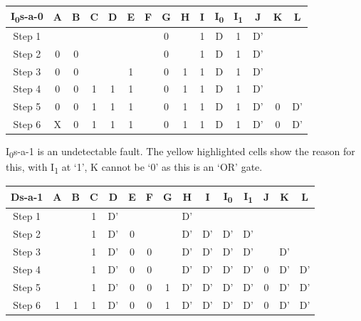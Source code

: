 \documentclass[11pt]{report}
\begin{document}
\begin{tabular}{ |c||c|c|c|c|c|c|c|c|c|c|c|c|c|c| }
\hline
\bf I\textsubscript{0}s-a-0 & \bf A & \bf B & \bf C & \bf D & \bf E & \bf F & G & H & I & I\textsubscript{0} & I\textsubscript{1} & J & K & \bf L \\
\hline
\hline
Step 1 & & & & & & & 0 & & 1 & D & 1 & D' & & \\
\hline
Step 2 & 0 & 0 & & & & & 0 & & 1 & D & 1 & D' & & \\
\hline
Step 3 & 0 & 0 & & & 1 & & 0 & 1 & 1 & D & 1 & D' & & \\
\hline
Step 4 & 0 & 0 & 1 & 1 & 1 & & 0 & 1 & 1 & D & 1 & D' & & \\
\hline
Step 5 & 0 & 0 & 1 & 1 & 1 & & 0 & 1 & 1 & D & 1 & D' & 0 & D' \\
\hline
Step 6 & X & 0 & 1 & 1 & 1 & & 0 & 1 & 1 & D & \cellcolor{yellow!50}1 & D' & \cellcolor{yellow!50}0 & D' \\
\hline
\end{tabular}

I\textsubscript{0}s-a-1 is an undetectable fault. The yellow highlighted cells show the reason for this, with I\textsubscript{1} at `1', K cannot be `0' as this is an `OR' gate.

\begin{tabular}{ |c||c|c|c|c|c|c|c|c|c|c|c|c|c|c| }
\hline
\bf Ds-a-1 & \bf A & \bf B & \bf C & \bf D & \bf E & \bf F & G & H & I & I\textsubscript{0} & I\textsubscript{1} & J & K & \bf L \\
\hline
\hline
Step 1 & & & 1 & D' & & & & D' & & & & & & \\
\hline
Step 2 & & & 1 & D' & 0 & & & D' & D' & D' & D' & & & \\
\hline
Step 3 & & & 1 & D' & 0 & 0 & & D' & D' & D' & D' & & D' & \\
\hline
Step 4 & & & 1 & D' & 0 & 0 & & D' & D' & D' & D' & 0 & D' & D' \\
\hline
Step 5 & & & 1 & D' & 0 & 0 & 1 & D' & D' & D' & D' & 0 & D' & D' \\
\hline
Step 6 & 1 & 1 & 1 & D' & 0 & 0 & 1 & D' & D' & D' & D' & 0 & D' & D' \\
\hline
\end{tabular}
\end{document}
